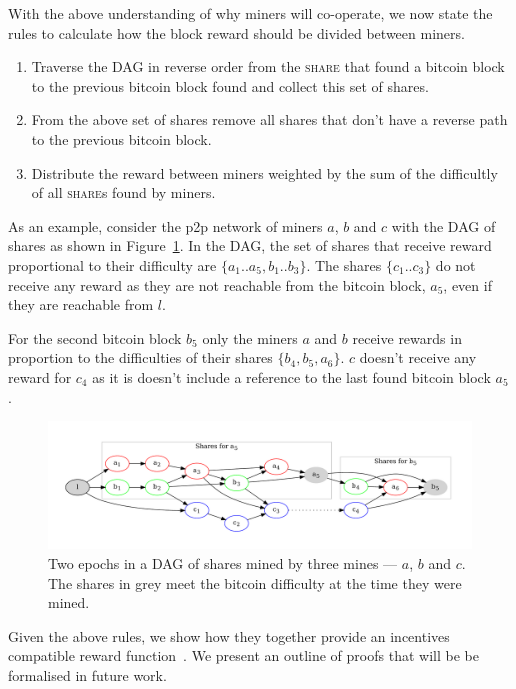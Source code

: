 \documentclass{article}
\begin{document}
With the above understanding of why miners will co-operate, we now
state the rules to calculate how the block reward should be divided
between miners.

\begin{enumerate}
\item Traverse the DAG in reverse order from the \textsc{share} that
  found a bitcoin block to the previous bitcoin block found and
  collect this set of shares.
\item From the above set of shares remove all shares that don't have
  a reverse path to the previous bitcoin block.
\item Distribute the reward between miners weighted by the sum of
  the difficultly of all \textsc{share}s found by miners.
\end{enumerate}

As an example, consider the p2p network of miners $a$, $b$ and $c$
with the DAG of shares as shown in Figure~\ref{fig:shares-dag}. In the
DAG, the set of shares that receive reward proportional to their
difficulty are $\{a_1..a_5, b_1..b_3\}$. The shares $\{c_1..c_3\}$ do
not receive any reward as they are not reachable from the bitcoin
block, $a_5$, even if they are reachable from $l$.

For the second bitcoin block $b_5$ only the miners $a$ and $b$ receive
rewards in proportion to the difficulties of their shares
$\{b_4, b_5, a_6\}$. $c$ doesn't receive any reward for $c_4$ as it is
doesn't include a reference to the last found bitcoin block $a_5$.

\begin{figure}
  \begin{center}
    \includegraphics[width=1.0\textwidth]{shares-dag}
    \caption{Two epochs in a DAG of shares mined by three mines ---
      $a$, $b$ and $c$. The shares in grey meet the bitcoin difficulty
      at the time they were mined.}\label{fig:shares-dag}
  \end{center}
\end{figure}

Given the above rules, we show how they together provide an incentives
compatible reward function~\cite{incentives-compatible}. We present an
outline of proofs that will be be formalised in future work.
\end{document}

